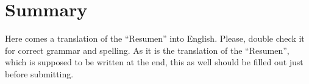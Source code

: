 \documentclass[a4paper, 12pt, oneside]{book}
\begin{document}

\chapter*{Summary}

Here comes a translation of the ``Resumen'' into English. 
Please, double check it for correct grammar and spelling.
As it is the translation of the ``Resumen'', which is supposed to be written at the end, this as well should be filled out just before submitting.


\listoftodos
\thispagestyle{empty}



\tableofcontents 
\thispagestyle{empty}
\cleardoublepage

\thispagestyle{empty}
\listoffigures %
\thispagestyle{empty}

\cleardoublepage

\mainmatter
\pagestyle{headings}
\end{document}
